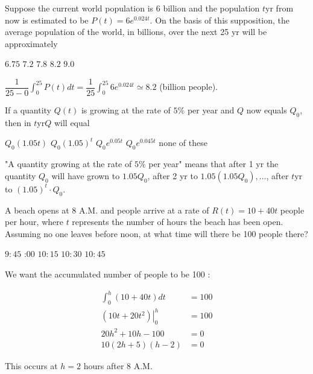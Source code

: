 \question
Suppose the current world population is 6 billion and the population $t \mathrm{yr}$ from now is estimated to be $P(t)=6 e^{0.024 t}$. On the basis of this supposition, the average population of the world, in billions, over the next 25 yr will be approximately
\begin{choices}
  \choice $6.75$
  \choice $7.2$
  \choice $7.8$
  \CorrectChoice $8.2$
  \choice $9.0$
\end{choices}
\begin{solution}
$\dfrac{1}{25-0} \int_{0}^{25} P(t) d t=\dfrac{1}{25} \int_{0}^{25} 6 e^{0.024 t} \simeq 8.2$ (billion people).
\end{solution}

\question
If a quantity $Q(t)$ is growing at the rate of $5 \%$ per year and $Q$ now equals $Q_{0}$, then in $t \mathrm{yr} Q$ will equal
\begin{choices}
  \choice $Q_{0}(1.05 t)$
  \CorrectChoice $Q_{0}(1.05)^{t}$
  \choice $Q_{0} e^{0.05 t}$
  \choice $Q_{0} e^{0.045 t}$
  \choice none of these
\end{choices}
\begin{solution}
"A quantity growing at the rate of $5 \%$ per year" means that after 1 yr the quantity $Q_{0}$ will have grown to $1.05 Q_{0}$, after 2 yr to $1.05\left(1.05 Q_{0}\right), \ldots$, after $t \mathrm{yr}$ to $(1.05)^{t} \cdot Q_{0}$.
\end{solution}



\newpage



\question
A beach opens at 8 A.M. and people arrive at a rate of $R(t)=10+40 t$ people per hour, where $t$ represents the number of hours the beach has been open. Assuming no one leaves before noon, at what time will there be 100 people there?
\begin{choices}
  \choice $9: 45$
  :00
  \choice $10: 15$
  \choice $10: 30$
  \choice $10: 45$
\end{choices}
\begin{solution}
We want the accumulated number of people to be 100 :


\[
\begin{aligned}
\int_{0}^{h}(10+40 t) d t & =100 \\
\left.\left(10 t+20 t^{2}\right)\right|_{0} ^{h} & =100 \\
20 h^{2}+10 h-100 & =0 \\
10(2 h+5)(h-2) & =0
\end{aligned}
\]

This occurs at $h=2$ hours after 8 A.M.
\end{solution}

